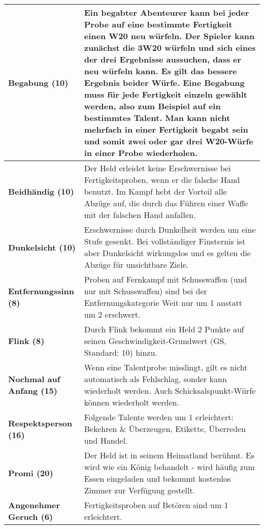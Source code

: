 \begin{longtable}{|p{5cm}|p{11cm}|}
\textbf{Begabung (10)} & Ein begabter Abenteurer kann bei jeder Probe auf eine bestimmte Fertigkeit einen W20 neu würfeln. Der Spieler kann zunächst die 3W20 würfeln und sich eines der drei Ergebnisse aussuchen, dass er neu würfeln kann. Es gilt das bessere Ergebnis beider Würfe. Eine Begabung muss für jede Fertigkeit einzeln gewählt werden, also zum Beispiel auf ein bestimmtes Talent. Man kann nicht mehrfach in einer Fertigkeit begabt sein und somit zwei oder gar drei W20-Würfe in einer Probe wiederholen. \\ \hline

\textbf{Beidhändig (10)} & Der Held erleidet keine Erschwernisse bei Fertigkeitsproben, wenn er die falsche Hand benutzt. Im Kampf hebt der Vorteil alle Abzüge auf, die durch das Führen einer Waffe mit der falschen Hand anfallen. \\ \hline

\textbf{Dunkelsicht (10)} & Erschwernisse durch Dunkelheit werden um eine Stufe gesenkt. Bei vollständiger Finsternis ist aber Dunkelsicht wirkungslos und es gelten die Abzüge für unsichtbare Ziele. \\ \hline

\textbf{Entfernungssinn (8)} & Proben auf Fernkampf mit Schusswaffen (und nur mit Schusswaffen) sind bei der Entfernungskategorie Weit nur um 1 anstatt um 2 erschwert. \\ \hline

\textbf{Flink (8)} & Durch Flink bekommt ein Held 2 Punkte auf seinen Geschwindigkeit-Grundwert (GS, Standard: 10) hinzu. \\ \hline

\textbf{Nochmal auf Anfang (15)} & Wenn eine Talentprobe misslingt, gilt es nicht automatisch als Fehlschlag, sonder kann wiederholt werden. Auch Schicksalspunkt-Würfe können wiederholt werden. \\ \hline

\textbf{Respektsperson (16)} & Folgende Talente werden um 1 erleichtert: Bekehren \& Überzeugen, Etikette, Überreden und Handel. \\ \hline

\textbf{Promi (20)} & Der Held ist in seinem Heimatland berühmt. Es wird wie ein König behandelt - wird häufig zum Essen eingeladen und bekommt kostenlos Zimmer zur Verfügung gestellt. \\ \hline

\textbf{Angenehmer Geruch (6)} & Fertigkeitsproben auf Betören sind um 1 erleichtert. \\ \hline


\end{longtable}
